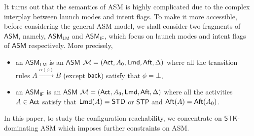 \documentclass[preprint,12pt]{elsarticle}
\newcommand\Mm{{\mathcal{M} }}
\newcommand\act{{\sf Act}}
\newcommand\aft{{\sf Aft}}
\newcommand\lmd{{\sf Lmd}}
\newcommand{\AMASS}{\textsf{ASM}}
\newcommand{\LMAMASS}{\textsf{ASM}_\textsf{LM}}
\newcommand{\IFAMASS}{\textsf{ASM}_\textsf{IF}}
\newcommand\back{{\mathsf{back} }}
\newcommand{\STK}{\mathsf{STK}}
\newcommand{\STD}{\mathsf{STD}}
\newcommand{\STP}{\mathsf{STP}}
\begin{document}
It turns out that the semantics of {\AMASS} is highly complicated due to the complex interplay between launch modes and intent flags. %
To make it more accessible, before considering the general {\AMASS} model, we %
shall consider two fragments of $\AMASS$, namely, $\LMAMASS$ and $\IFAMASS$, which focus on launch modes and intent flags of $\AMASS$ respectively. More precisely, 
\begin{itemize}
	\item an $\LMAMASS$ is an $\AMASS$ $\Mm = (\act, A_0, \lmd, \aft, \Delta)$ where all the transition rules $A \xrightarrow{\alpha(\phi)} B$ (except $\back$) satisfy that $\phi = \bot$, 
	\item an $\IFAMASS$ is an $\AMASS$ $\Mm = (\act, A_0, \lmd, \aft, \Delta)$ where all the activities $A\in\act$ satisfy that $\lmd(A) = \STD$ or $\STP$ and $\aft(A) = \aft(A_0)$.
\end{itemize}



	


%
In this paper, to study the configuration reachability, we %
concentrate on $\STK$-dominating {\AMASS} which imposes further constraints on {\AMASS}. %
	
	
\end{document}
